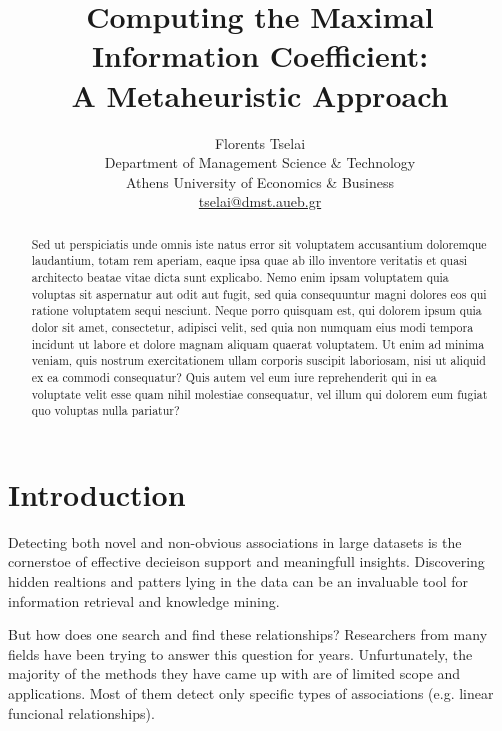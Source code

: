 \documentclass[12pt]{article}
\begin{document}
\title{Computing the Maximal Information Coefficient:\\A Metaheuristic Approach}
\author{
Florents Tselai\\
Department of Management Science \& Technology\\
Athens University of Economics \& Business\\
\href{mailto:tselai@dmst.aueb.gr}{tselai@dmst.aueb.gr}
}
\date{}
\maketitle

\begin{abstract}
Sed ut perspiciatis unde omnis iste natus error sit voluptatem accusantium doloremque laudantium, totam rem aperiam, eaque ipsa quae ab illo inventore veritatis et quasi architecto beatae vitae dicta sunt explicabo. Nemo enim ipsam voluptatem quia voluptas sit aspernatur aut odit aut fugit, sed quia consequuntur magni dolores eos qui ratione voluptatem sequi nesciunt. Neque porro quisquam est, qui dolorem ipsum quia dolor sit amet, consectetur, adipisci velit, sed quia non numquam eius modi tempora incidunt ut labore et dolore magnam aliquam quaerat voluptatem. Ut enim ad minima veniam, quis nostrum exercitationem ullam corporis suscipit laboriosam, nisi ut aliquid ex ea commodi consequatur? Quis autem vel eum iure reprehenderit qui in ea voluptate velit esse quam nihil molestiae consequatur, vel illum qui dolorem eum fugiat quo voluptas nulla pariatur?
\end{abstract}




\section{Introduction}

Detecting both novel
and non-obvious associations in large datasets
is the cornerstoe of effective decieison support and meaningfull insights.
Discovering hidden realtions and patters lying in the data
can be an invaluable tool for information retrieval and knowledge mining.

But how does one search and find these relationships?
Researchers from many fields have been trying to answer
this question for years. Unfurtunately,
the majority of the methods they have came up with
are of limited scope and applications.
Most of them detect only specific types of associations (e.g. linear funcional relationships).
\end{document}
